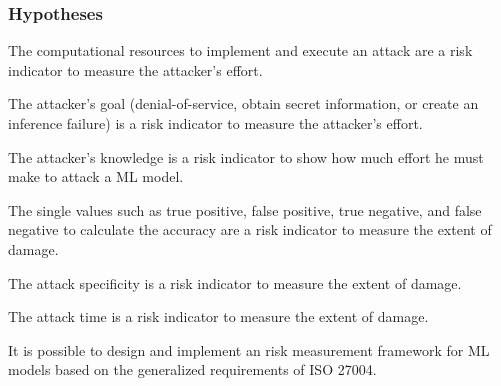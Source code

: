 \subsubsection*{Hypotheses}


\begin{hypotheses}
  \item The computational resources to implement and execute an attack are a risk indicator to measure the attacker's effort. \label{itm:h1}
  \item The attacker's goal (denial-of-service, obtain secret information, or create an inference failure) is a risk indicator to measure the attacker's effort. \label{itm:h2}
  \item The attacker's knowledge is a risk indicator to show how much effort he must make to attack a ML model. \label{itm:h3}
  \item The single values such as true positive, false positive, true negative, and false negative to calculate the accuracy are a risk indicator to measure the extent of damage. \label{itm:h4}
  \item The attack specificity is a risk indicator to measure the extent of damage. \label{itm:h5}
  \item The attack time is a risk indicator to measure the extent of damage. \label{itm:h6}
  \item It is possible to design and implement an risk measurement framework for ML models based on the generalized requirements of ISO 27004. \label{itm:h7}
\end{hypotheses}
